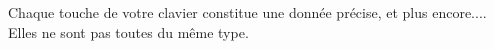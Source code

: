 \documentclass{beamer}
\begin{document}
\begin{frame}
\vspace{-1cm}                                                                                                                                                                                                                                                                                                                                                                                                                                                                                                                                                                                                                                                                                                                                                                                                                                                                                                                                                                                                                                                                                                                                                                                                                                                                                                                                                                                                                                                                                                                                                                                                                                                                                                                                                                                                                                                                                                                                                                                                Chaque touche de votre clavier constitue une donnée précise, et plus encore.... Elles ne sont pas toutes du même type.                                                                                                                                                                                                                                                                                                                                                                                                                                                                                                                                                                                                                                                                                                                                                                                                                                                                                                                                                                                                                                                                                                                                                                                                                                                       
\end{frame}
\end{document}
